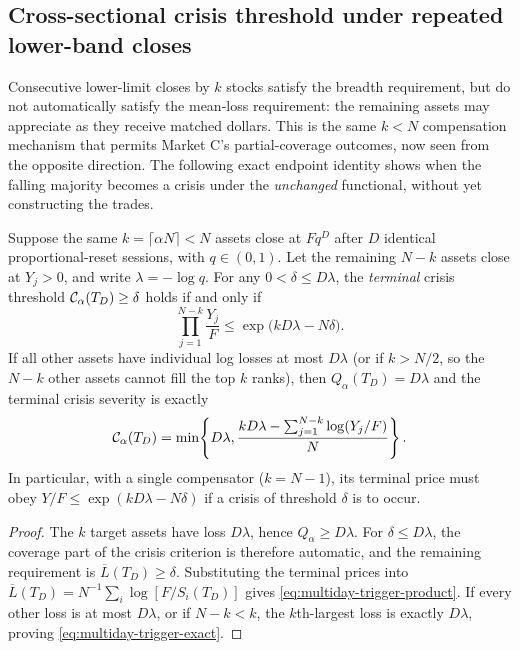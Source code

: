 \documentclass[review,hidelinks,onefignum,onetabnum]{siamonline250211}
\begin{document}
\subsection{Cross-sectional crisis threshold under repeated lower-band closes}\label{subsec:multiday-breadth}
Consecutive lower-limit closes by $k$ stocks satisfy the breadth requirement, but do not automatically satisfy the mean-loss requirement: the remaining assets may appreciate as they receive matched dollars. This is the same $k<N$ compensation mechanism that permits Market C's partial-coverage outcomes, now seen from the opposite direction. The following exact endpoint identity shows when the falling majority becomes a crisis under the \emph{unchanged} functional, without yet constructing the trades.
\begin{proposition}\label{prop:multiday-crisis-trigger}
Suppose the same $k=\lceil\alpha N\rceil<N$ assets close at $Fq^D$ after $D$ identical proportional-reset sessions, with $q\in(0,1)$. Let the remaining $N-k$ assets close at $Y_j>0$, and write $\lambda=-\log q$. For any $0<\delta\le D\lambda$, the \emph{terminal} crisis threshold $\mathcal{C}_\alpha(T_D)\ge\delta$ holds if and only if
\begin{equation}\label{eq:multiday-trigger-product}
\qquad \prod_{j=1}^{N-k}\frac{Y_j}{F}
 \le\exp\bigl(kD\lambda-N\delta\bigr).\qquad
\end{equation}
If all other assets have individual log losses at most $D\lambda$ (or if $k>N/2$, so the $N-k$ other assets cannot fill the top $k$ ranks), then $Q_\alpha(T_D)=D\lambda$ and the terminal crisis severity is exactly
\begin{equation}\label{eq:multiday-trigger-exact}
\quad\mathcal{C}_\alpha(T_D)=\min\!\left\{D\lambda,
 \frac{kD\lambda-\sum_{j=1}^{N-k}\log(Y_j/F)}{N}\right\}.\quad
\end{equation}
In particular, with a single compensator ($k=N-1$), its terminal price must obey $Y/F\le\exp(kD\lambda-N\delta)$ if a crisis of threshold $\delta$ is to occur.
\end{proposition}
\begin{proof}
The $k$ target assets have loss $D\lambda$, hence $Q_\alpha\ge D\lambda$. For $\delta\le D\lambda$, the coverage part of the crisis criterion is therefore automatic, and the remaining requirement is $\overline L(T_D)\ge\delta$. Substituting the terminal prices into $\overline L(T_D)=N^{-1}\sum_i\log[F/S_i(T_D)]$ gives \eqref{eq:multiday-trigger-product}. If every other loss is at most $D\lambda$, or if $N-k<k$, the $k$th-largest loss is exactly $D\lambda$, proving \eqref{eq:multiday-trigger-exact}.
\end{proof}
\end{document}
